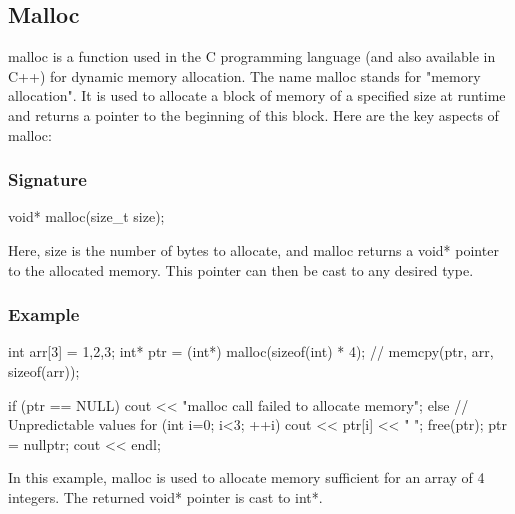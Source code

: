 \documentclass{report}
\begin{document}
\begin{concept}
    \bigbreak \noindent 
    \subsection{Malloc}
    \bigbreak \noindent 
    \begin{concept}
        malloc is a function used in the C programming language (and also available in C++) for dynamic memory allocation. The name malloc stands for "memory allocation". It is used to allocate a block of memory of a specified size at runtime and returns a pointer to the beginning of this block. Here are the key aspects of malloc:
    \end{concept}
    \bigbreak \noindent 
    \subsubsection{Signature}
    \bigbreak \noindent 
    \begin{cppcode}
    void* malloc(size_t size);
    \end{cppcode}
    \bigbreak \noindent 
    Here, size is the number of bytes to allocate, and malloc returns a void* pointer to the allocated memory. This pointer can then be cast to any desired type.
    \bigbreak \noindent 
    \subsubsection{Example}
    \begin{cppcode}
    int arr[3] = {1,2,3};
    int* ptr = (int*) malloc(sizeof(int) * 4);
    // memcpy(ptr, arr, sizeof(arr));

    if (ptr == NULL) { cout << "malloc call failed to allocate memory";
    } else {
        // Unpredictable values
        for (int i=0; i<3; ++i)  {
            cout << ptr[i] << " ";
        }
    }
    free(ptr);
    ptr = nullptr;
    cout << endl;
    \end{cppcode}
    \bigbreak \noindent 
    In this example, malloc is used to allocate memory sufficient for an array of 4 integers. The returned void* pointer is cast to int*.

    \bigbreak \noindent 

\end{concept}
\end{document}

